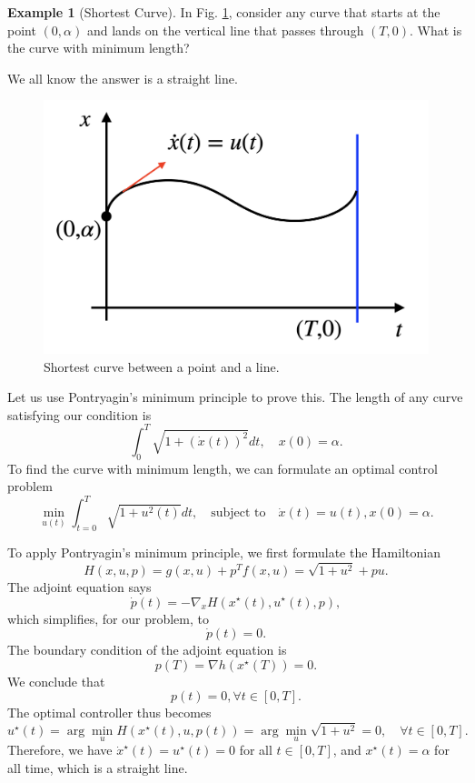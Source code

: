 \documentclass[
]{book}
\theoremstyle{definition}
\theoremstyle{definition}
\newtheorem{example}{Example}[chapter]
\theoremstyle{definition}
\theoremstyle{definition}
\theoremstyle{remark}
\begin{document}
\begin{example}[Shortest Curve]
\protect\hypertarget{exm:shortest-line}{}\label{exm:shortest-line}In Fig. \ref{fig:shortest-curve}, consider any curve that starts at the point \((0,\alpha)\) and lands on the vertical line that passes through \((T,0)\). What is the curve with minimum length?

We all know the answer is a straight line.

\begin{figure}

{\centering \includegraphics[width=0.6\linewidth]{images/shortest_path} 

}

\caption{Shortest curve between a point and a line.}\label{fig:shortest-curve}
\end{figure}

Let us use Pontryagin's minimum principle to prove this. The length of any curve satisfying our condition is
\[
\int_{0}^{T} \sqrt{1 + (\dot{x}(t))^2} dt, \quad x(0) = \alpha.
\]
To find the curve with minimum length, we can formulate an optimal control problem
\[
\min_{u(t)} \int_{t=0}^T \sqrt{ 1 + u^2(t)} dt, \quad \text{subject to} \quad \dot{x}(t) = u(t), x(0) = \alpha.
\]

To apply Pontryagin's minimum principle, we first formulate the Hamiltonian
\[
H(x,u,p) = g(x,u) + p^T f(x,u) = \sqrt{1 + u^2} + pu.
\]
The adjoint equation says
\[
\dot{p}(t) = - \nabla_x H(x^\star(t),u^\star(t),p),
\]
which simplifies, for our problem, to
\[
\dot{p}(t) = 0.
\]
The boundary condition of the adjoint equation is
\[
p(T) = \nabla h(x^\star(T)) = 0.
\]
We conclude that
\[
p(t) = 0, \forall t \in [0,T].
\]
The optimal controller thus becomes
\[
u^\star(t) = \arg\min_u H(x^\star(t),u,p(t)) = \arg\min_u \sqrt{1 + u^2} = 0, \quad \forall t \in [0,T].
\]
Therefore, we have \(\dot{x}^\star(t) = u^\star(t) = 0\) for all \(t \in [0,T]\), and \(x^\star(t) = \alpha\) for all time, which is a straight line.
\end{example}
\end{document}
